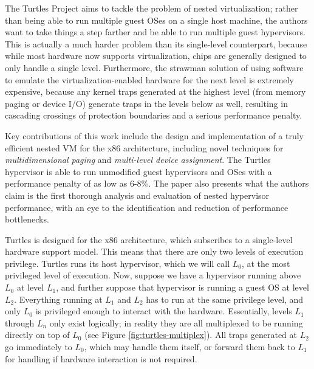 \documentclass[letterpaper, twocolumn]{article}
\begin{document}
The Turtles Project \cite{ref:turtles} aims to tackle the problem of
nested virtualization; rather than being able to run multiple guest OSes
on a single host machine, the authors want to take things a step farther
and be able to run multiple guest hypervisors.  This is actually a
much harder problem than its single-level counterpart, because while
most hardware now supports virtualization, chips are generally designed
to only handle a single level.  Furthermore, the strawman solution of
using software to emulate the virtualization-enabled hardware for the next level is
extremely expensive, because any kernel traps generated at the highest
level (from memory paging or device I/O) generate traps in the levels
below as well, resulting in cascading crossings of protection
boundaries and a serious performance penalty.

Key contributions of this work include the design and implementation
of a truly efficient nested VM for the x86 architecture, including novel
techniques for \emph{multidimensional paging} and
\emph{multi-level device assignment}.  The Turtles hypervisor is able to
run unmodified guest hypervisors and OSes with a performance penalty of
as low as 6-8\%.  The paper also presents what the authors claim is the
first thorough analysis and evaluation of nested hypervisor performance,
with an eye to the identification and reduction of performance bottlenecks.

Turtles is designed for the x86 architecture, which subscribes to a
single-level hardware support model.  This means that there are only two
levels of execution privilege.  Turtles runs its host hypervisor, which
we will call $L_0$, at the most privileged level of execution.  Now, suppose
we have a hypervisor running above $L_0$ at level $L_1$, and further suppose 
that hypervisor is running a guest OS at level $L_2$.  Everything running at $L_1$
and $L_2$ has to run at the same privilege level, and only $L_0$ is privileged enough
to interact with the hardware.  Essentially, levels $L_1$ through $L_n$ only
exist logically; in reality they are all multiplexed to be running directly
on top of $L_0$ (see Figure \ref{fig:turtles-multiplex}).  All traps generated at
$L_2$ go immediately to $L_0$, which may handle them itself, or forward them
back to $L_1$ for handling if hardware interaction is not required.
\end{document}
